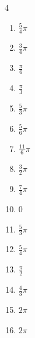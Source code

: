 \begin{multicols}{4}
\begin{enumerate}
  \item $\displaystyle \frac{5}{4}\pi$

  \item $\displaystyle \frac{3}{4}\pi$

  \item $\displaystyle \frac{\pi}{6}$

  \item $\displaystyle \frac{\pi}{3}$

  \item $\displaystyle \frac{5}{3}\pi$

  \item $\displaystyle \frac{5}{6}\pi$

  \item $\displaystyle \frac{11}{6}\pi$

  \item $\displaystyle \frac{3}{2}\pi$

  \item $\displaystyle \frac{7}{4}\pi$

  \item $\displaystyle 0$

  \item $\displaystyle \frac{5}{3}\pi$

  \item $\displaystyle \frac{5}{4}\pi$

  \item $\displaystyle \frac{\pi}{2}$

  \item $\displaystyle \frac{4}{3}\pi$

  \item $\displaystyle 2\pi$

  \item $\displaystyle 2\pi$


\end{enumerate}
\end{multicols}
